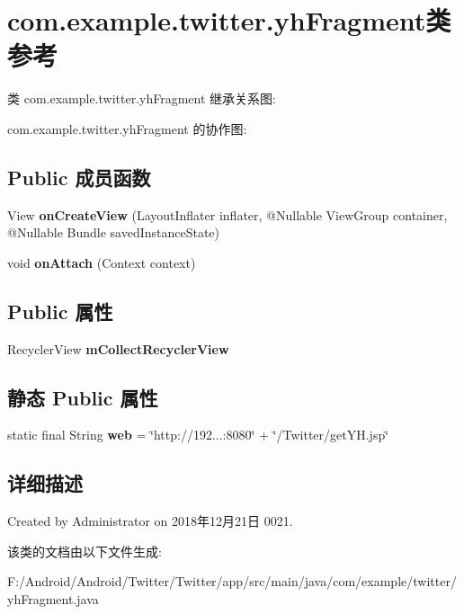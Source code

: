 \hypertarget{classcom_1_1example_1_1twitter_1_1yh_fragment}{}\section{com.\+example.\+twitter.\+yh\+Fragment类 参考}
\label{classcom_1_1example_1_1twitter_1_1yh_fragment}


类 com.\+example.\+twitter.\+yh\+Fragment 继承关系图\+:


com.\+example.\+twitter.\+yh\+Fragment 的协作图\+:
\subsection*{Public 成员函数}
\begin{DoxyCompactItemize}
\item 
\mbox{\label{classcom_1_1example_1_1twitter_1_1yh_fragment_a848bcc6ece0c33dacb14596442607255}} 
View {\bfseries on\+Create\+View} (Layout\+Inflater inflater, @Nullable View\+Group container, @Nullable Bundle saved\+Instance\+State)
\item 
\mbox{\label{classcom_1_1example_1_1twitter_1_1yh_fragment_a4d354543fee1e182299cab3fd2f09b6e}} 
void {\bfseries on\+Attach} (Context context)
\end{DoxyCompactItemize}
\subsection*{Public 属性}
\begin{DoxyCompactItemize}
\item 
\mbox{\label{classcom_1_1example_1_1twitter_1_1yh_fragment_a7b79d1dc87746ecc1477853278c44c88}} 
Recycler\+View {\bfseries m\+Collect\+Recycler\+View}
\end{DoxyCompactItemize}
\subsection*{静态 Public 属性}
\begin{DoxyCompactItemize}
\item 
\mbox{\label{classcom_1_1example_1_1twitter_1_1yh_fragment_afa4fd0009d18d4d920d0dabc7a6869c8}} 
static final String {\bfseries web} = \char`\"{}http\+://192...\+:8080\char`\"{} + \char`\"{}/Twitter/get\+Y\+H.\+jsp\char`\"{}
\end{DoxyCompactItemize}


\subsection{详细描述}
Created by Administrator on 2018年12月21日 0021. 

该类的文档由以下文件生成\+:\begin{DoxyCompactItemize}
\item 
F\+:/\+Android/\+Android/\+Twitter/\+Twitter/app/src/main/java/com/example/twitter/yh\+Fragment.\+java\end{DoxyCompactItemize}
